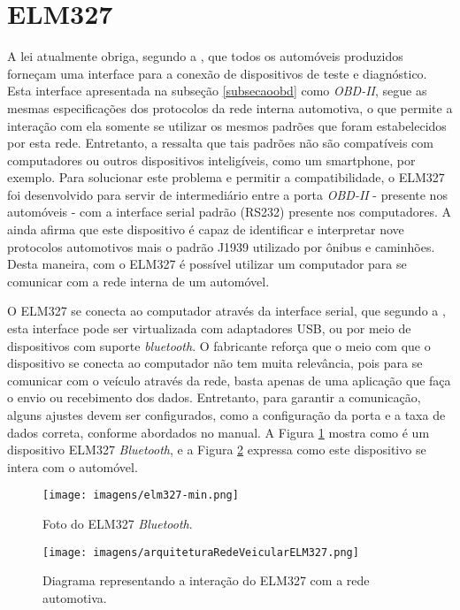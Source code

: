 \section{ELM327}
A lei atualmente obriga, segundo a , que todos os automóveis produzidos forneçam uma interface para a conexão de dispositivos de teste e diagnóstico. Esta interface apresentada na subseção \ref{subsecaoobd} como \textit{OBD-II}, segue as mesmas especificações dos protocolos da rede interna automotiva, o que permite a interação com ela somente se utilizar os mesmos padrões que foram estabelecidos por esta rede. Entretanto, a  ressalta que tais padrões não são compatíveis com computadores ou outros dispositivos inteligíveis, como um smartphone, por exemplo. Para solucionar este problema e permitir a compatibilidade, o ELM327 foi desenvolvido para servir de intermediário entre a porta \textit{OBD-II} - presente nos automóveis - com a interface serial padrão (RS232) presente nos computadores. A  ainda afirma que este dispositivo é capaz de identificar e interpretar nove protocolos automotivos mais o padrão J1939 utilizado por ônibus e caminhões. Desta maneira, com o ELM327 é possível utilizar um computador para se comunicar com a rede interna de um automóvel.

O ELM327 se conecta ao computador através da interface serial, que segundo a , esta interface pode ser virtualizada com adaptadores USB, ou por meio de dispositivos com suporte \textit{bluetooth}. O fabricante reforça que o meio com que o dispositivo se conecta ao computador não tem muita relevância, pois para se comunicar com o veículo através da rede, basta apenas de uma aplicação que faça o envio ou recebimento dos dados. Entretanto, para garantir a comunicação, alguns ajustes devem ser configurados, como a configuração da porta e a taxa de dados correta, conforme abordados no manual. A Figura \ref{Fig:elm327} mostra como é um dispositivo ELM327 \textit{Bluetooth}, e a Figura \ref{Fig:rede_veicular_elm327} expressa como este dispositivo se intera com o automóvel.

\begin{figure}[!ht]
\centering
\caption{Foto do ELM327 \textit{Bluetooth}.} 
{\texttt{[image: imagens/elm327-min.png]}}\\
 \label{Fig:elm327}
\end{figure}

\begin{figure}[!ht]
\centering
\caption{Diagrama representando a interação do ELM327 com a rede automotiva.} 
{\texttt{[image: imagens/arquiteturaRedeVeicularELM327.png]}}\\
 \label{Fig:rede_veicular_elm327}
\end{figure}


